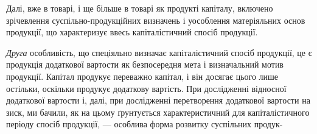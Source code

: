Далі, вже в товарі, і ще більше в товарі як продукті капіталу, включено
зрічевлення суспільно-продукційних визначень і уособлення матеріяльних
основ продукції, що характеризує ввесь капіталістичний спосіб продукції.

\emph{Друга} особливість, що спеціяльно визначає капіталістичний спосіб продукції,
це є продукція додаткової вартости як безпосередня мета і визначальний
мотив продукції. Капітал продукує переважно капітал, і він досягає цього
лише остільки, оскільки продукує додаткову вартість. При дослідженні відносної
додаткової вартости і, далі, при дослідженні перетворення додаткової вартости
на зиск, ми бачили, як на цьому ґрунтується характеристичний для капіталістичного
періоду спосіб продукції, — особлива форма розвитку суспільних продук-
\parbreak{}  %
